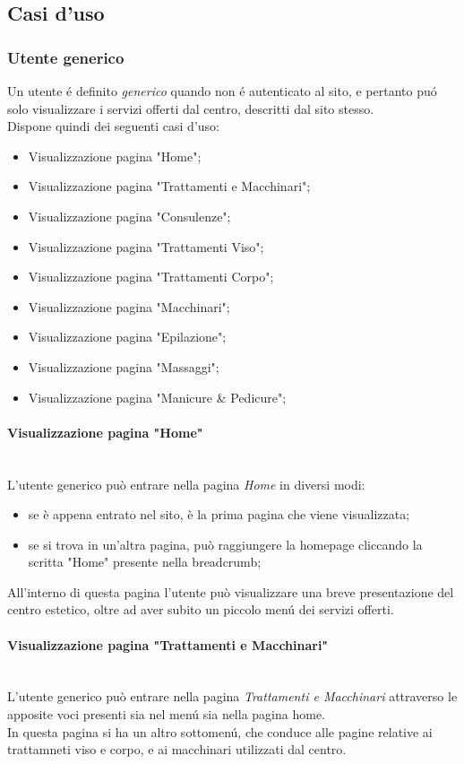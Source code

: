 \documentclass{article}
\begin{document}
\subsection{Casi d'uso}
\subsubsection{Utente generico}
Un utente é definito \textit{generico} quando non é autenticato al sito, e pertanto puó solo visualizzare i servizi offerti dal centro, descritti dal sito stesso.\\
Dispone quindi dei seguenti casi d'uso:
\begin{itemize}
	\item Visualizzazione pagina "Home";
	\item Visualizzazione pagina "Trattamenti e Macchinari";
	\item Visualizzazione pagina "Consulenze";
	\item Visualizzazione pagina "Trattamenti Viso";
	\item Visualizzazione pagina "Trattamenti Corpo";
	\item Visualizzazione pagina "Macchinari";
	\item Visualizzazione pagina "Epilazione";
	\item Visualizzazione pagina "Massaggi";
	\item Visualizzazione pagina "Manicure \& Pedicure";
\end{itemize}
\paragraph{Visualizzazione pagina "Home"}\mbox{}\\
L'utente generico può entrare nella pagina \textit{Home} in diversi modi:
\begin{itemize}
	\item se è appena entrato nel sito, è la prima pagina che viene visualizzata;
	\item se si trova in un'altra pagina, può raggiungere la homepage cliccando la scritta "Home" presente nella breadcrumb;
\end{itemize}
All'interno di questa pagina l'utente può visualizzare una breve presentazione del centro estetico, oltre ad aver subito un piccolo menú dei servizi offerti.

\paragraph{Visualizzazione pagina "Trattamenti e Macchinari"}\mbox{}\\
L'utente generico può entrare nella pagina \textit{Trattamenti e Macchinari} attraverso le apposite voci presenti sia nel menú sia nella pagina home.\\
In questa pagina si ha un altro sottomenú, che conduce alle pagine relative ai trattamneti viso e corpo, e ai macchinari utilizzati dal centro.
\end{document}
